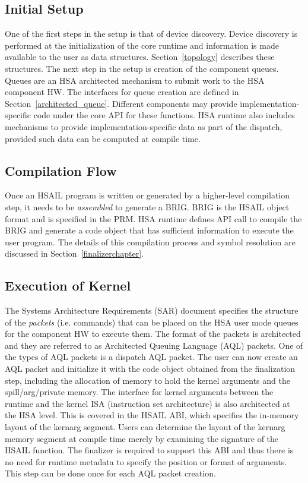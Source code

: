 \documentclass{book}
\begin{document}
\subsection{Initial Setup}
One of the first steps in the setup is that of device discovery.
Device discovery is performed at the initialization of the core
runtime and information is made available to the user as data
structures. Section~\ref{topology} describes these structures.
The next step in the setup is creation of the
component queues. Queues are an HSA architected mechanism to submit
work to the HSA component HW. The interfaces for queue creation
are defined in Section~\ref{architected_queue}. Different
components may provide
implementation-\/specific code under the core API for these
functions. HSA runtime also includes mechanisms to provide
implementation-\/specific data as part of the dispatch, provided
such data can be computed at compile time.

\subsection{Compilation Flow}
Once an HSAIL program is written or generated by a higher-level
compilation step, it needs to be \emph{assembled} to generate a
BRIG. BRIG is the HSAIL object format and is specified in the PRM.
HSA runtime defines API call to compile the BRIG and generate a code
object that has sufficient information to execute the user
program. The details of this compilation process and symbol
resolution are discussed in Section~\ref{finalizerchapter}.

\subsection{Execution of Kernel}
The Systems Architecture Requirements (SAR) document specifies the
structure of the \emph{packets} (i.e. commands) that can be placed on
the HSA user mode queues for the component HW to execute them. The
format of the packets is architected and they are referred to as
Architected Queuing Language (AQL) packets. One of the types of AQL
packets is a dispatch AQL packet.
The user can now create an AQL packet
and initialize it with the code object obtained from the
finalization step, including the
allocation of memory to hold the kernel arguments and the
spill/arg/private memory.
The interface for kernel arguments between the runtime and the
kernel ISA (instruction set architecture) is also architected at
the HSA level. This is covered in the HSAIL ABI,
which specifies the in-\/memory layout of the kernarg segment. Users
can determine the layout of the kernarg memory segment at compile
time merely by examining the signature of the HSAIL
function. The finalizer is required to support this ABI and thus
there is no need for runtime metadata to specify the position or
format of arguments.
This step can be done once for each AQL packet creation.
\end{document}
